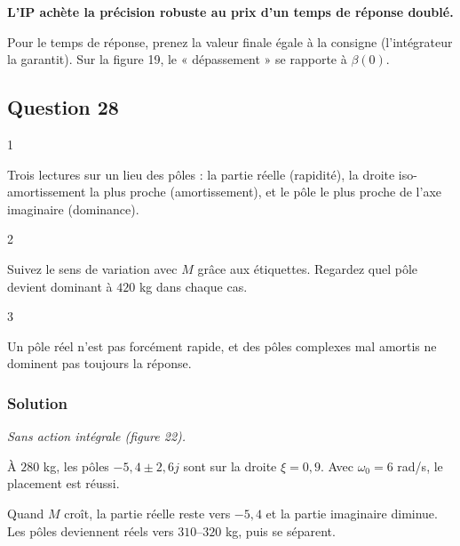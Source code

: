 \documentclass[11pt,a4paper]{article}
\begin{document}
\textbf{L'IP achète la précision robuste au prix d'un temps de réponse doublé.}

\begin{piege}

Pour le temps de réponse, prenez la valeur finale égale à la consigne (l'intégrateur la garantit). Sur la figure 19, le « dépassement » se rapporte à \(\beta(0)\).

\end{piege}

\hypertarget{question-28}{%
\subsection{Question 28}\label{question-28}}

\begin{indication}{1}

Trois lectures sur un lieu des pôles : la partie réelle (rapidité), la droite iso-amortissement la plus proche (amortissement), et le pôle le plus proche de l'axe imaginaire (dominance).

\end{indication}

\begin{indication}{2}

Suivez le sens de variation avec \(M\) grâce aux étiquettes. Regardez quel pôle devient dominant à \(420\) kg dans chaque cas.

\end{indication}

\begin{indication}{3}

Un pôle réel n'est pas forcément rapide, et des pôles complexes mal amortis ne dominent pas toujours la réponse.

\end{indication}

\hypertarget{solution-27}{%
\subsubsection{Solution}\label{solution-27}}

\emph{Sans action intégrale (figure 22).}

À \(280\) kg, les pôles \(-5{,}4\pm2{,}6j\) sont sur la droite \(\xi=0{,}9\). Avec \(\omega_0=6\) rad/s, le placement est réussi.

Quand \(M\) croît, la partie réelle reste vers \(-5{,}4\) et la partie imaginaire diminue. Les pôles deviennent réels vers \(310\)--\(320\) kg, puis se séparent.
\end{document}
